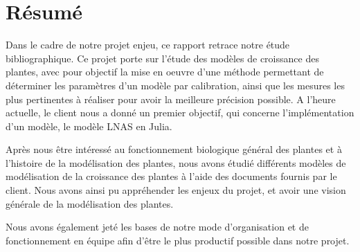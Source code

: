 \section{Résumé}

Dans le cadre de  notre projet enjeu, ce rapport retrace notre étude bibliographique. 
Ce projet porte sur l'étude des modèles de croissance des plantes, avec pour objectif la mise en oeuvre d'une méthode permettant de déterminer les paramètres d'un modèle par calibration, ainsi que les mesures les plus pertinentes à réaliser pour avoir la meilleure précision possible.
A l'heure actuelle, le client nous a donné un premier objectif, qui concerne l'implémentation d'un modèle, le modèle LNAS en Julia.
 

Après nous être intéressé au fonctionnement biologique général des plantes et à l'histoire de la modélisation des plantes, nous avons étudié différents modèles de modélisation de la croissance des plantes à l'aide des documents fournis par le client.
Nous avons ainsi pu appréhender les enjeux du projet, et avoir une vision générale de la modélisation des plantes.

Nous avons également jeté les bases de notre mode d'organisation et de fonctionnement en équipe afin d'être le plus productif possible dans notre projet.